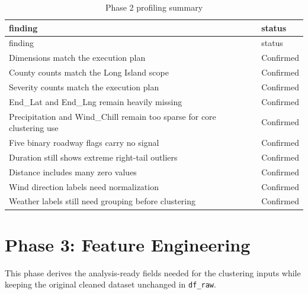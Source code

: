 \documentclass[
]{article}
\begin{document}
\begin{longtable}[]{@{}
  >{\raggedright\arraybackslash}p{}
  >{\raggedright\arraybackslash}p{}@{}}
\caption{Phase 2 profiling summary}\tabularnewline
\toprule\noalign{}
\begin{minipage}[b]{\linewidth}\raggedright
finding
\end{minipage} & \begin{minipage}[b]{\linewidth}\raggedright
status
\end{minipage} \\
\midrule\noalign{}
\endfirsthead
\toprule\noalign{}
\begin{minipage}[b]{\linewidth}\raggedright
finding
\end{minipage} & \begin{minipage}[b]{\linewidth}\raggedright
status
\end{minipage} \\
\midrule\noalign{}
\endhead
\bottomrule\noalign{}
\endlastfoot
Dimensions match the execution plan & Confirmed \\
County counts match the Long Island scope & Confirmed \\
Severity counts match the execution plan & Confirmed \\
End\_Lat and End\_Lng remain heavily missing & Confirmed \\
Precipitation and Wind\_Chill remain too sparse for core clustering use
& Confirmed \\
Five binary roadway flags carry no signal & Confirmed \\
Duration still shows extreme right-tail outliers & Confirmed \\
Distance includes many zero values & Confirmed \\
Wind direction labels need normalization & Confirmed \\
Weather labels still need grouping before clustering & Confirmed \\
\end{longtable}

\section{Phase 3: Feature
Engineering}\label{phase-3-feature-engineering}

This phase derives the analysis-ready fields needed for the clustering
inputs while keeping the original cleaned dataset unchanged in
\texttt{df\_raw}.
\end{document}
